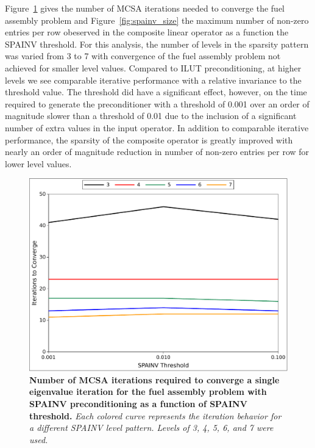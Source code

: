 Figure~\ref{fig:spainv_iterations} gives the number of MCSA iterations
needed to converge the fuel assembly problem and
Figure~\ref{fig:spainv_size} the maximum number of non-zero entries
per row obeserved in the composite linear operator as a function the
SPAINV threshold. For this analysis, the number of levels in the
sparsity pattern was varied from 3 to 7 with convergence of the fuel
assembly problem not achieved for smaller level values. Compared to
ILUT preconditioning, at higher levels we see comparable iterative
performance with a relative invariance to the threshold value. The
threshold did have a significant effect, however, on the time required
to generate the preconditioner with a threshold of 0.001 over an order
of magnitude slower than a threshold of 0.01 due to the inclusion of a
significant number of extra values in the input operator. In addition
to comparable iterative performance, the sparsity of the composite
operator is greatly improved with nearly an order of magnitude
reduction in number of non-zero entries per row for lower level
values.
\begin{figure}[t!]
  \begin{center}
    \includegraphics[width=6in]{chapters/spn_equations/spainv_iterations.pdf}
  \end{center}
  \caption{\textbf{Number of MCSA iterations required to converge a
      single eigenvalue iteration for the fuel assembly problem with
      SPAINV preconditioning as a function of SPAINV threshold.}
    \textit{Each colored curve represents the iteration behavior for a
      different SPAINV level pattern. Levels of 3, 4, 5, 6, and 7 were
      used.}}
  \label{fig:spainv_iterations}
\end{figure}
